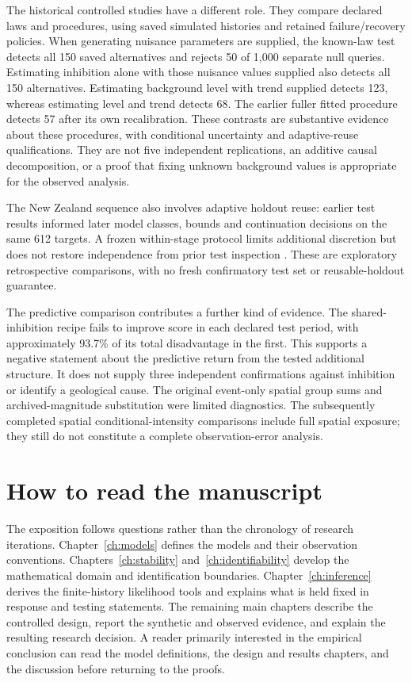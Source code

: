 The historical controlled studies have a different role. They compare declared laws and procedures, using saved simulated histories and retained failure/recovery policies. When generating nuisance parameters are supplied, the known-law test detects all 150 saved alternatives and rejects 50 of 1,000 separate null queries. Estimating inhibition alone with those nuisance values supplied also detects all 150 alternatives. Estimating background level with trend supplied detects 123, whereas estimating level and trend detects 68. The earlier fuller fitted procedure detects 57 after its own recalibration. These contrasts are substantive evidence about these procedures, with conditional uncertainty and adaptive-reuse qualifications. They are not five independent replications, an additive causal decomposition, or a proof that fixing unknown background values is appropriate for the observed analysis.

The New Zealand sequence also involves adaptive holdout reuse: earlier test results informed later model classes, bounds and continuation decisions on the same 612 targets. A frozen within-stage protocol limits additional discretion but does not restore independence from prior test inspection \citep{Dwork2015}. These are exploratory retrospective comparisons, with no fresh confirmatory test set or reusable-holdout guarantee.

The predictive comparison contributes a further kind of evidence. The shared-inhibition recipe fails to improve score in each declared test period, with approximately 93.7\% of its total disadvantage in the first. This supports a negative statement about the predictive return from the tested additional structure. It does not supply three independent confirmations against inhibition or identify a geological cause. The original event-only spatial group sums and archived-magnitude substitution were limited diagnostics. The subsequently completed spatial conditional-intensity comparisons include full spatial exposure; they still do not constitute a complete observation-error analysis.

\section{How to read the manuscript}

The exposition follows questions rather than the chronology of research iterations. Chapter~\ref{ch:models} defines the models and their observation conventions. Chapters~\ref{ch:stability} and~\ref{ch:identifiability} develop the mathematical domain and identification boundaries. Chapter~\ref{ch:inference} derives the finite-history likelihood tools and explains what is held fixed in response and testing statements. The remaining main chapters describe the controlled design, report the synthetic and observed evidence, and explain the resulting research decision. A reader primarily interested in the empirical conclusion can read the model definitions, the design and results chapters, and the discussion before returning to the proofs.

